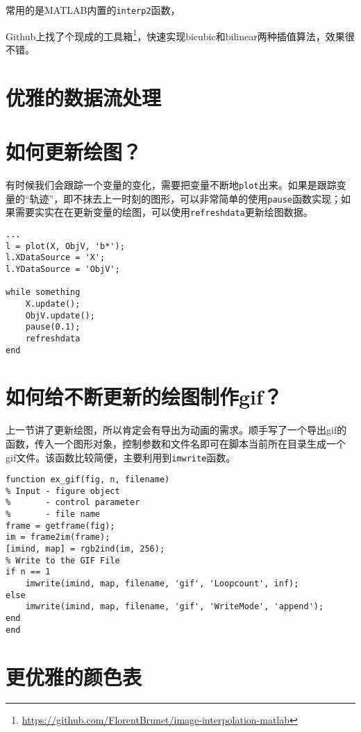 常用的是MATLAB内置的\texttt{interp2}函数，

Github上找了个现成的工具箱\footnote{\url{https://github.com/FlorentBrunet/image-interpolation-matlab}}，快速实现bicubic和bilinear两种插值算法，效果很不错。


\section{优雅的数据流处理}

\section{如何更新绘图？}

有时候我们会跟踪一个变量的变化，需要把变量不断地\texttt{plot}出来。如果是跟踪变量的“轨迹”，即不抹去上一时刻的图形，可以非常简单的使用\texttt{pause}函数实现；如果需要实实在在更新变量的绘图，可以使用\texttt{refreshdata}更新绘图数据。

\begin{verbatim}
...
l = plot(X, ObjV, 'b*');
l.XDataSource = 'X';
l.YDataSource = 'ObjV';

while something
    X.update();
    ObjV.update();
    pause(0.1);
    refreshdata
end
\end{verbatim}

\section{如何给不断更新的绘图制作gif？}

上一节讲了更新绘图，所以肯定会有导出为动画的需求。顺手写了一个导出gif的函数，传入一个图形对象，控制参数和文件名即可在脚本当前所在目录生成一个gif文件。该函数比较简便，主要利用到\texttt{imwrite}函数。

\begin{verbatim}
function ex_gif(fig, n, filename)
% Input - figure object
%       - control parameter
%       - file name
frame = getframe(fig);
im = frame2im(frame);
[imind, map] = rgb2ind(im, 256);
% Write to the GIF File
if n == 1
    imwrite(imind, map, filename, 'gif', 'Loopcount', inf);
else
    imwrite(imind, map, filename, 'gif', 'WriteMode', 'append');
end
end
\end{verbatim}


\section{更优雅的颜色表}

